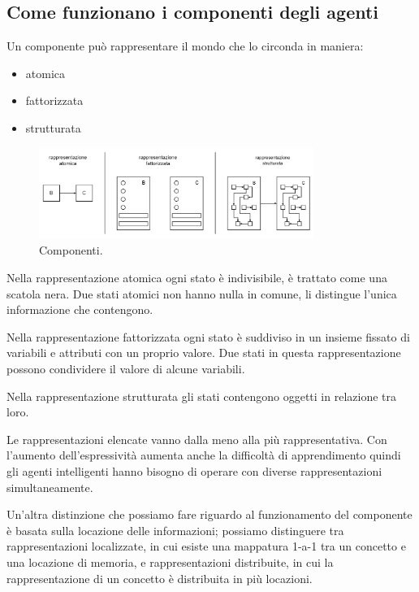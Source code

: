 \subsection{Come funzionano i componenti degli agenti}

Un componente può rappresentare il mondo che lo circonda in maniera:

\begin{itemize}
	\item atomica
	\item fattorizzata
	\item strutturata
\end{itemize}

\begin{figure}[H]
	\centering
	\includegraphics[width=0.8\textwidth]{capitoli/agenti-intelligenti/imgs/componenti.png}
	\caption{Componenti.}
\end{figure}

Nella rappresentazione atomica ogni stato è indivisibile, è trattato come una scatola nera. Due stati atomici non hanno nulla in comune, li distingue l'unica informazione che contengono.

Nella rappresentazione fattorizzata ogni stato è suddiviso in un insieme fissato di variabili e attributi con un proprio valore. Due stati in questa rappresentazione possono condividere il valore di alcune variabili.

Nella rappresentazione strutturata gli stati contengono oggetti in relazione tra loro.

Le rappresentazioni elencate vanno dalla meno alla più rappresentativa. Con l'aumento dell'espressività aumenta anche la difficoltà di apprendimento quindi gli agenti intelligenti hanno bisogno di operare con diverse rappresentazioni simultaneamente.

Un'altra distinzione che possiamo fare riguardo al funzionamento del componente è basata sulla locazione delle informazioni; possiamo distinguere tra rappresentazioni localizzate, in cui esiste una mappatura 1-a-1 tra un concetto e una locazione di memoria, e rappresentazioni distribuite, in cui la rappresentazione di un concetto è distribuita in più locazioni.